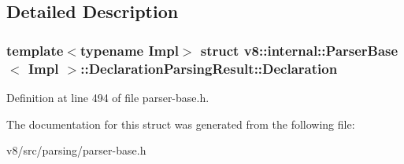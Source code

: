 \subsection{Detailed Description}
\subsubsection*{template$<$typename Impl$>$\newline
struct v8\+::internal\+::\+Parser\+Base$<$ Impl $>$\+::\+Declaration\+Parsing\+Result\+::\+Declaration}



Definition at line 494 of file parser-\/base.\+h.



The documentation for this struct was generated from the following file\+:\begin{DoxyCompactItemize}
\item 
v8/src/parsing/parser-\/base.\+h\end{DoxyCompactItemize}

